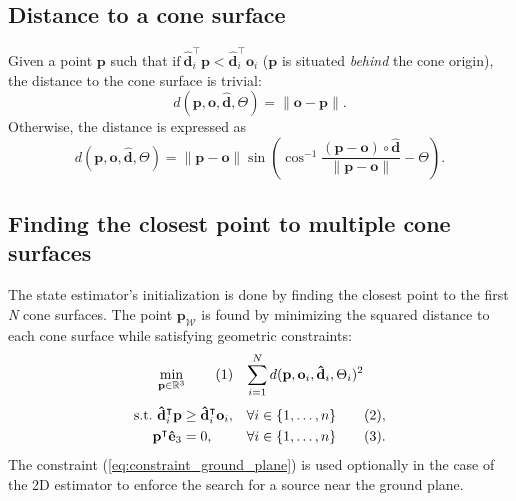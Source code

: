 \documentclass[a4paper,11pt,titlepage,twoside]{book}
\newcommand\numberthis{\addtocounter{equation}{1}\tag{\theequation}}
\begin{document}


\subsection{Distance to a cone surface}

Given a point $\mathbf{p}$ such that $\text{if}\ \mathbf{\hat{d}}^{\intercal}_{i}\mathbf{p} < \mathbf{\hat{d}}_i^{\intercal}\mathbf{o}_i$ ($\mathbf{p}$ is situated \emph{behind} the cone origin), the distance to the cone surface is trivial:
\begin{equation}
  d(\mathbf{p}, \mathbf{o}, \mathbf{\hat{d}}, \Theta) = \|\mathbf{o} - \mathbf{p}\|.
\end{equation}
Otherwise, the distance is expressed as
\begin{equation}
  d(\mathbf{p}, \mathbf{o}, \mathbf{\hat{d}}, \Theta) = \|\mathbf{p} - \mathbf{o}\| \sin \left( \cos^{-1}\frac{\left(\mathbf{p} - \mathbf{o}\right) \circ \mathbf{\hat{d}}}{\|\mathbf{p} - \mathbf{o}\|} - \Theta\right).
\end{equation}



\subsection{Finding the closest point to multiple cone surfaces}

The state estimator's initialization is done by finding the closest point to the first \emph{N} cone surfaces.
The point $\mathbf{p}_\mathcal{W}$ is found by minimizing the squared distance to each cone surface while satisfying geometric constraints:
\begin{align*}
  & \min_{\mathbf{p} \in \mathbb{R}^3} \label{eq:mpc_cost}\numberthis
  & \sum_{i=1}^{N}d(\mathbf{p}, \mathbf{o}_i, \mathbf{\hat{d}}_i, \Theta_i)^2
\end{align*}\begin{align*}
  \text{s.t.}~ \mathbf{\hat{d}}^{\intercal}_{i}\mathbf{p} &\geq \mathbf{\hat{d}}_i^{\intercal}\mathbf{o}_i, &\forall i &\in \{1, \hdots, n\}\numberthis\label{eq:constraint_cone_halfspace},\\
  \mathbf{p}^\intercal\mathbf{\hat{e}}_3 &= 0, &\forall i &\in \{1, \hdots, n\}\numberthis\label{eq:constraint_ground_plane}.
\end{align*}
The constraint (\ref{eq:constraint_ground_plane}) is used optionally in the case of the 2D estimator to enforce the search for a source near the ground plane.
\end{document}
